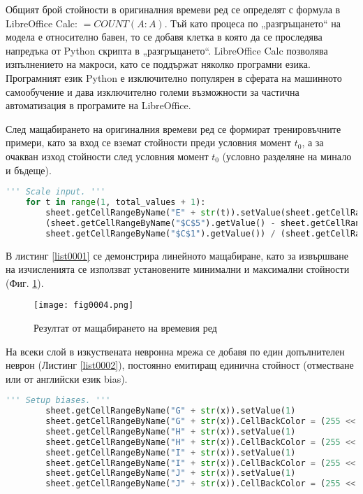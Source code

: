 Общият брой стойности в оригиналния времеви ред се определят с формула в LibreOffice Calc: $=COUNT(A:A)$. Тъй като процеса по „разгръщането“ на модела е относително бавен, то се добавя клетка в която да се проследява напредъка от Python скрипта в „разгръщането“. LibreOffice Calc позволява изпълнението на макроси, като се поддържат няколко програмни езика. Програмният език Python е изключително популярен в сферата на машинното самообучение и дава изключително големи възможности за частична автоматизация в програмите на LibreOffice.

След мащабирането на оригиналния времеви ред се формират тренировъчните примери, като за вход се вземат стойности преди условния момент $t_0$, а за очакван изход стойности след условния момент $t_0$ (условно разделяне на минало и бъдеще).

\begin{lstlisting}[caption=Мащабиране на оригиналния времеви ред, language=Python, basicstyle=\tiny, label=list0001]
    ''' Scale input. '''
    for t in range(1, total_values + 1):
        sheet.getCellRangeByName("E" + str(t)).setValue(sheet.getCellRangeByName("$C$4").getValue() + 
        (sheet.getCellRangeByName("$C$5").getValue() - sheet.getCellRangeByName("$C$4").getValue()) * ((sheet.getCellRangeByName("A" + str(t)).getValue() - 
        sheet.getCellRangeByName("$C$1").getValue()) / (sheet.getCellRangeByName("$C$2").getValue() - sheet.getCellRangeByName("$C$1").getValue())))
\end{lstlisting}

В листинг \ref{list0001} се демонстрира линейното мащабиране, като за извършване на изчисленията се използват установените минимални и максимални стойности (Фиг. \ref{fig0004}). 

\begin{figure}[H]
  \centering
  \texttt{[image: fig0004.png]}
  \caption{Резултат от мащабирането на времевия ред}
\label{fig0004}
\end{figure}

На всеки слой в изкуствената невронна мрежа се добавя по един допълнителен неврон (Листинг \ref{list0002}), постоянно емитиращ единична стойност (отместване или от английски език bias).

\begin{lstlisting}[caption=Неврони емитиращи постоянно единичен сигнал, language=Python, basicstyle=\tiny, label=list0002]
        ''' Setup biases. '''
        sheet.getCellRangeByName("G" + str(x)).setValue(1)
        sheet.getCellRangeByName("G" + str(x)).CellBackColor = (255 << 16 | 255 << 8 | 0)
        sheet.getCellRangeByName("H" + str(x)).setValue(1)
        sheet.getCellRangeByName("H" + str(x)).CellBackColor = (255 << 16 | 255 << 8 | 0)
        sheet.getCellRangeByName("I" + str(x)).setValue(1)
        sheet.getCellRangeByName("I" + str(x)).CellBackColor = (255 << 16 | 255 << 8 | 0)
        sheet.getCellRangeByName("J" + str(x)).setValue(1)
        sheet.getCellRangeByName("J" + str(x)).CellBackColor = (255 << 16 | 255 << 8 | 0)
\end{lstlisting}

